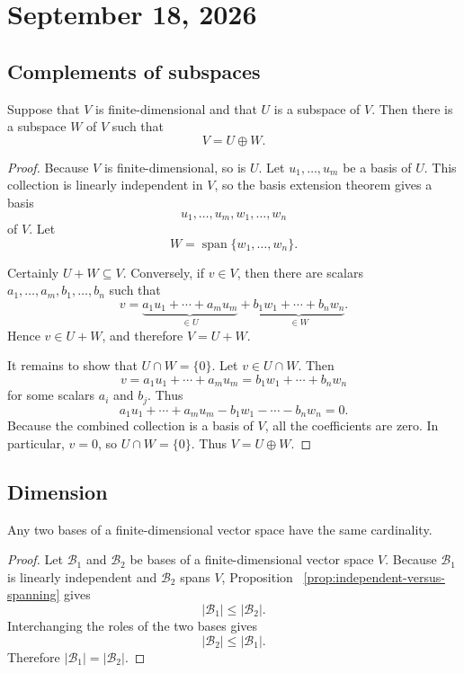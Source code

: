 \section{September 18, 2026}

\subsection{Complements of subspaces}

\begin{proposition}
  Suppose that $V$ is finite-dimensional and that $U$ is a subspace of
  $V$. Then there is a subspace $W$ of $V$ such that
  \[
    V=U\oplus W.
  \]
\end{proposition}

\begin{proof}
  Because $V$ is finite-dimensional, so is $U$. Let
  $u_1,\ldots,u_m$ be a basis of $U$. This collection is linearly
  independent in $V$, so the basis extension theorem gives a basis
  \[
    u_1,\ldots,u_m,w_1,\ldots,w_n
  \]
  of $V$. Let
  \[
    W=\operatorname{span}\{w_1,\ldots,w_n\}.
  \]

  Certainly $U+W\subseteq V$. Conversely, if $v\in V$, then there are
  scalars $a_1,\ldots,a_m,b_1,\ldots,b_n$ such that
  \[
    v=\underbrace{a_1u_1+\cdots+a_mu_m}_{\in U}
      +\underbrace{b_1w_1+\cdots+b_nw_n}_{\in W}.
  \]
  Hence $v\in U+W$, and therefore $V=U+W$.

  It remains to show that $U\cap W=\{0\}$. Let $v\in U\cap W$. Then
  \[
    v=a_1u_1+\cdots+a_mu_m=b_1w_1+\cdots+b_nw_n
  \]
  for some scalars $a_i$ and $b_j$. Thus
  \[
    a_1u_1+\cdots+a_mu_m-b_1w_1-\cdots-b_nw_n=0.
  \]
  Because the combined collection is a basis of $V$, all the
  coefficients are zero. In particular, $v=0$, so $U\cap W=\{0\}$.
  Thus $V=U\oplus W$.
\end{proof}

\subsection{Dimension}

\begin{proposition}
  Any two bases of a finite-dimensional vector space have the same
  cardinality.
\end{proposition}

\begin{proof}
  Let $\mathcal B_1$ and $\mathcal B_2$ be bases of a finite-dimensional
  vector space $V$. Because $\mathcal B_1$ is linearly independent and
  $\mathcal B_2$ spans $V$, Proposition~
  \ref{prop:independent-versus-spanning} gives
  \[
    \lvert\mathcal B_1\rvert\leq\lvert\mathcal B_2\rvert.
  \]
  Interchanging the roles of the two bases gives
  \[
    \lvert\mathcal B_2\rvert\leq\lvert\mathcal B_1\rvert.
  \]
  Therefore $\lvert\mathcal B_1\rvert=\lvert\mathcal B_2\rvert$.
\end{proof}


